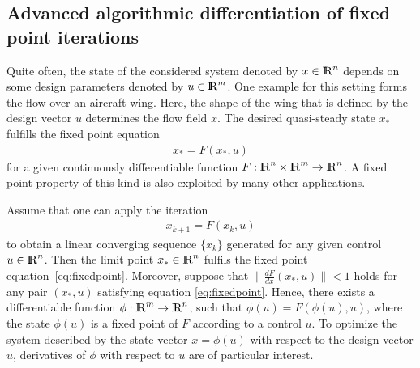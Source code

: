 \documentclass[11pt,twoside]{article}
\newcommand{\R}{{ {\rm I} \kern -.225em {\rm R} }}
\begin{document}
\subsection{Advanced algorithmic differentiation of fixed point iterations}
%
Quite often, the state of the considered system denoted by $x\in\R^n$
depends on some design parameters denoted by $u\in\R^m$. One example for this setting
forms the flow over an aircraft wing. Here, the shape of the wing that
is defined by the design vector $u$  
determines the flow field $x$. The desired quasi-steady state $x_*$
fulfills the fixed point equation
\begin{align}
  \label{eq:fixedpoint}
  x_* = F(x_*,u)
\end{align}
for a given continuously differentiable function 
$F:\R^n\times\R^m\rightarrow\R^n$. A fixed point property of this kind is
also exploited by many other applications.

Assume that one can apply the iteration  
\begin{align}
\label{eq:iteration}
 x_{k+1} = F(x_k,u)
\end{align}
to obtain a linear converging sequence $\{x_k\}$ generated
for any given control $u\in\R^n$. Then the limit point $x_*\in\R^n$ fulfils the fixed
point equation~\eqref{eq:fixedpoint}. Moreover,
suppose that $\|\frac{dF}{dx}(x_*,u)\|<1$ holds for any pair
$(x_*,u)$ satisfying equation \eqref{eq:fixedpoint}.
Hence, there exists a
differentiable function $\phi:\R^m \rightarrow \R^n$,
such that $\phi(u) = F(\phi(u),u)$, where the state 
$\phi(u)$ is a fixed point of $F$ according to a control
$u$. To optimize the system described by the state vector $x=\phi(u)$ with respect to
the design vector $u$, derivatives of $\phi$ with respect
to $u$ are of particular interest.
\end{document}
